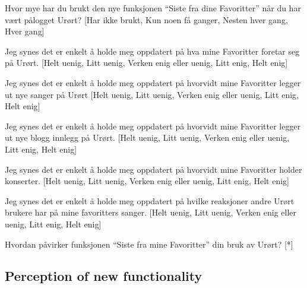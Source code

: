 \begin{enum}
  \item Hvor mye har du brukt den nye funksjonen ``Siste fra dine Favoritter''
    når du har vært pålogget Urørt?
    [Har ikke brukt, Kun noen få ganger, Nesten hver gang, Hver gang]
  \item Jeg synes det er enkelt å holde meg oppdatert på
    hva mine Favoritter foretar seg på Urørt.
    [Helt uenig, Litt uenig, Verken enig eller uenig, Litt enig, Helt enig]
  \item Jeg synes det er enkelt å holde meg oppdatert på
    hvorvidt mine Favoritter legger ut nye sanger på Urørt
    [Helt uenig, Litt uenig, Verken enig eller uenig, Litt enig, Helt enig]
  \item Jeg synes det er enkelt å holde meg oppdatert på
    hvorvidt mine Favoritter legger ut nye blogg innlegg på Urørt.
    [Helt uenig, Litt uenig, Verken enig eller uenig, Litt enig, Helt enig]
  \item Jeg synes det er enkelt å holde meg oppdatert på
    hvorvidt mine Favoritter holder konserter.
    [Helt uenig, Litt uenig, Verken enig eller uenig, Litt enig, Helt enig]
  \item Jeg synes det er enkelt å holde meg oppdatert på
    hvilke reaksjoner andre Urørt brukere har på mine favoritters sanger.
    [Helt uenig, Litt uenig, Verken enig eller uenig, Litt enig, Helt enig]
  \item Hvordan påvirker funksjonen ``Siste fra mine Favoritter'' din bruk av
    Urørt? [*]
\end{enum}


\subsection{Perception of new functionality}

